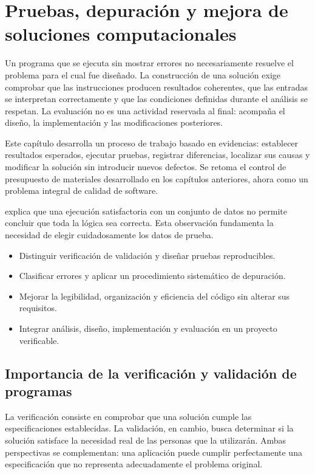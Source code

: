 \chapter{Pruebas, depuración y mejora de soluciones computacionales}
\label{cap:04-pruebas-y-mejora}

Un programa que se ejecuta sin mostrar errores no necesariamente resuelve el problema para el cual fue diseñado. La construcción de una solución exige comprobar que las instrucciones producen resultados coherentes, que las entradas se interpretan correctamente y que las condiciones definidas durante el análisis se respetan. La evaluación no es una actividad reservada al final: acompaña el diseño, la implementación y las modificaciones posteriores.

Este capítulo desarrolla un proceso de trabajo basado en evidencias: establecer resultados esperados, ejecutar pruebas, registrar diferencias, localizar sus causas y modificar la solución sin introducir nuevos defectos. Se retoma el control de presupuesto de materiales desarrollado en los capítulos anteriores, ahora como un problema integral de calidad de software.

\textcite[pp.~12–13]{farrell2013} explica que una ejecución satisfactoria con un conjunto de datos no permite concluir que toda la lógica sea correcta. Esta observación fundamenta la necesidad de elegir cuidadosamente los datos de prueba.

\begin{resultados}
  \begin{itemize}
    \item Distinguir verificación de validación y diseñar pruebas reproducibles.
    \item Clasificar errores y aplicar un procedimiento sistemático de depuración.
    \item Mejorar la legibilidad, organización y eficiencia del código sin alterar sus requisitos.
    \item Integrar análisis, diseño, implementación y evaluación en un proyecto verificable.
  \end{itemize}
\end{resultados}

\section{Importancia de la verificación y validación de programas}

La verificación consiste en comprobar que una solución cumple las especificaciones establecidas. La validación, en cambio, busca determinar si la solución satisface la necesidad real de las personas que la utilizarán. Ambas perspectivas se complementan: una aplicación puede cumplir perfectamente una especificación que no representa adecuadamente el problema original.

